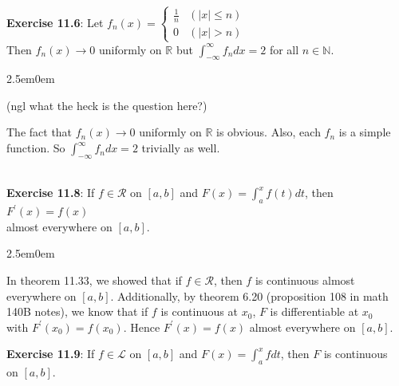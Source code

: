 \documentclass{book}
\newcommand{\exTwo}{%
   \color{RedViolet}%
   \fontsize{13}{15}\selectfont%
}
\newenvironment{myIndent}{%
   \begin{adjustwidth}{2.5em}{0em}%
}{%
   \end{adjustwidth}%
}
\newcommand{\mySepTwo}[1][.]{%
   {\noindent\color{#1}{\rule{6.5in}{0.5mm}}}\\%
}
\newcommand{\retTwo}{\hfill\bigbreak}
\begin{document}
\mySepTwo

\textbf{Exercise 11.6}: Let $f_n(x) = \left\{
\begin{matrix}
   \frac{1}{n} & (|x| \leq n) \\ 0 & (|x| > n)
\end{matrix}\right.$\\ Then $f_n(x) \rightarrow 0$ uniformly on $\mathbb{R}$ but $\int_{-\infty}^{\infty} f_ndx = 2$ for all $n \in \mathbb{N}$.\\ [-6pt]

{\begin{myIndent}\exTwo
   (ngl what the heck is the question here?)\retTwo

   The fact that $f_n(x) \rightarrow 0$ uniformly on $\mathbb{R}$ is obvious. Also, each $f_n$ is a simple\\ [2pt] function. So $\int_{-\infty}^{\infty} f_ndx = 2$ trivially as well.
\end{myIndent}}

\newpage

\mySepTwo

\textbf{Exercise 11.8}: If $f \in \mathscr{R}$ on $[a, b]$ and $F(x) = \int_a^x f(t)dt$, then $F^\prime(x) = f(x)$\\ almost everywhere on $[a, b]$.\\ [-6pt]

{\begin{myIndent}\exTwo
   In theorem 11.33, we showed that if $f \in \mathscr{R}$, then $f$ is continuous almost\\ everywhere on $[a, b]$. Additionally, by theorem 6.20 (proposition 108 in math\\ 140B notes), we know that if $f$ is continuous at $x_0$, $F$ is differentiable at $x_0$\\ with $F^\prime(x_0) = f(x_0)$. Hence $F^\prime(x) = f(x)$ almost everywhere on $[a, b]$.\retTwo
\end{myIndent}}

\textbf{Exercise 11.9}: If $f \in \mathscr{L}$ on $[a, b]$ and $F(x) = \int_a^x fdt$, then $F$ is continuous\\ on $[a, b]$.\\ [-6pt]
\end{document}
